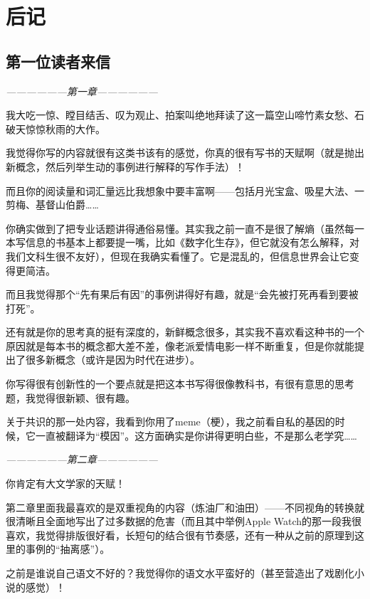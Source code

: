 \chapter*{后记}
{}
\thispagestyle{plain}

\section{第一位读者来信}
\begin{myquote}
\textit{------------------第一章------------------}

我大吃一惊、瞠目结舌、叹为观止、拍案叫绝地拜读了这一篇空山啼竹素女愁、石破天惊惊秋雨的大作。

我觉得你写的内容就很有这类书该有的感觉，你真的很有写书的天赋啊（就是抛出新概念，然后列举生动的事例进行解释的写作手法）！

而且你的阅读量和词汇量远比我想象中要丰富啊——包括月光宝盒、吸星大法、一剪梅、基督山伯爵……

你确实做到了把专业话题讲得通俗易懂。其实我之前一直不是很了解熵（虽然每一本写信息的书基本上都要提一嘴，比如《数字化生存》，但它就没有怎么解释，对我们文科生很不友好），但现在我确实看懂了。它是混乱的，但信息世界会让它变得更简洁。

而且我觉得那个“先有果后有因”的事例讲得好有趣，就是“会先被打死再看到要被打死”。

还有就是你的思考真的挺有深度的，新鲜概念很多，其实我不喜欢看这种书的一个原因就是每本书的概念都大差不差，像老派爱情电影一样不断重复，但是你就能提出了很多新概念（或许是因为时代在进步）。

你写得很有创新性的一个要点就是把这本书写得很像教科书，有很有意思的思考题，我觉得很新颖、很有趣。

关于共识的那一处内容，我看到你用了meme（梗），我之前看自私的基因的时候，它一直被翻译为“模因”。这方面确实是你讲得更明白些，不是那么老学究……


\textit{------------------第二章------------------}

你肯定有大文学家的天赋！

第二章里面我最喜欢的是双重视角的内容（炼油厂和油田）——不同视角的转换就很清晰且全面地写出了过多数据的危害（而且其中举例Apple Watch的那一段我很喜欢，我觉得排版很好看，长短句的结合很有节奏感，还有一种从之前的原理到这里的事例的“抽离感”）。

之前是谁说自己语文不好的？我觉得你的语文水平蛮好的（甚至营造出了戏剧化小说的感觉）！


\end{myquote}

